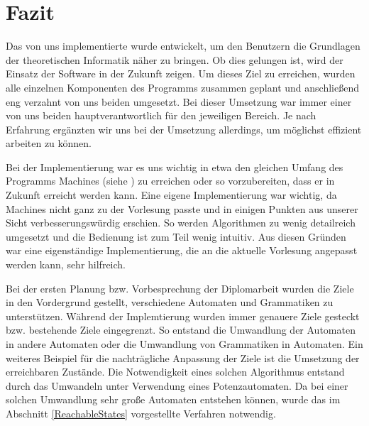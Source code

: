 



\chapter{Fazit}\label{Conclusion}

Das von uns implementierte \gtitool wurde entwickelt, um den Benutzern die
Grundlagen der theoretischen Informatik näher zu bringen. Ob dies gelungen ist,
wird der Einsatz der Software in der Zukunft zeigen. Um dieses Ziel zu erreichen,
wurden alle einzelnen Komponenten des Programms zusammen geplant und anschließend
eng verzahnt von uns beiden umgesetzt. Bei dieser Umsetzung war immer einer von
uns beiden hauptverantwortlich für den jeweiligen Bereich. Je nach Erfahrung
ergänzten wir uns bei der Umsetzung allerdings, um möglichst effizient arbeiten
zu können.\vspace{10pt}

Bei der Implementierung war es uns wichtig in etwa den gleichen Umfang des
Programms Machines (siehe \cite{machines}) zu erreichen oder so vorzubereiten,
dass er in Zukunft erreicht werden kann. Eine eigene Implementierung war
wichtig, da Machines nicht ganz zu der Vorlesung passte und in einigen Punkten
aus unserer Sicht verbesserungswürdig erschien. So werden Algorithmen zu wenig
detailreich umgesetzt und die Bedienung ist zum Teil wenig intuitiv. Aus diesen
Gründen war eine eigenständige Implementierung, die an die aktuelle Vorlesung
angepasst werden kann, sehr hilfreich.\vspace{10pt}

Bei der ersten Planung bzw. Vorbesprechung der Diplomarbeit wurden die Ziele in
den Vordergrund gestellt, verschiedene Automaten und Grammatiken zu
unterstützen. Während der Implemtierung wurden immer genauere Ziele gesteckt
bzw. bestehende Ziele eingegrenzt. So entstand die Umwandlung der Automaten in
andere Automaten oder die Umwandlung von Grammatiken in Automaten. Ein weiteres
Beispiel für die nachträgliche Anpassung der Ziele ist die Umsetzung der
erreichbaren Zustände. Die Notwendigkeit eines solchen Algorithmus entstand
durch das Umwandeln unter Verwendung eines Potenzautomaten. Da bei einer
solchen Umwandlung sehr große Automaten entstehen können, wurde das im
Abschnitt \ref{ReachableStates} vorgestellte Verfahren notwendig.\vspace{10pt}

